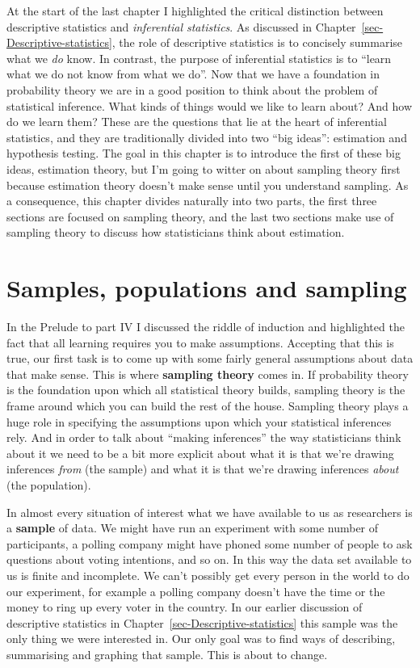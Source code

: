 \documentclass[
  a4paper,
]{book}
\begin{document}
At the start of the last chapter I highlighted the critical distinction
between descriptive statistics and \emph{inferential statistics}. As
discussed in Chapter~\ref{sec-Descriptive-statistics}, the role of
descriptive statistics is to concisely summarise what we \emph{do} know.
In contrast, the purpose of inferential statistics is to ``learn what we
do not know from what we do''. Now that we have a foundation in
probability theory we are in a good position to think about the problem
of statistical inference. What kinds of things would we like to learn
about? And how do we learn them? These are the questions that lie at the
heart of inferential statistics, and they are traditionally divided into
two ``big ideas'': estimation and hypothesis testing. The goal in this
chapter is to introduce the first of these big ideas, estimation theory,
but I'm going to witter on about sampling theory first because
estimation theory doesn't make sense until you understand sampling. As a
consequence, this chapter divides naturally into two parts, the first
three sections are focused on sampling theory, and the last two sections
make use of sampling theory to discuss how statisticians think about
estimation.

\hypertarget{samples-populations-and-sampling}{%
\section{Samples, populations and
sampling}\label{samples-populations-and-sampling}}

In the Prelude to part IV I discussed the riddle of induction and
highlighted the fact that all learning requires you to make assumptions.
Accepting that this is true, our first task is to come up with some
fairly general assumptions about data that make sense. This is where
\textbf{sampling theory} comes in. If probability theory is the
foundation upon which all statistical theory builds, sampling theory is
the frame around which you can build the rest of the house. Sampling
theory plays a huge role in specifying the assumptions upon which your
statistical inferences rely. And in order to talk about ``making
inferences'' the way statisticians think about it we need to be a bit
more explicit about what it is that we're drawing inferences \emph{from}
(the sample) and what it is that we're drawing inferences \emph{about}
(the population).

In almost every situation of interest what we have available to us as
researchers is a \textbf{sample} of data. We might have run an
experiment with some number of participants, a polling company might
have phoned some number of people to ask questions about voting
intentions, and so on. In this way the data set available to us is
finite and incomplete. We can't possibly get every person in the world
to do our experiment, for example a polling company doesn't have the
time or the money to ring up every voter in the country. In our earlier
discussion of descriptive statistics in
Chapter~\ref{sec-Descriptive-statistics} this sample was the only thing
we were interested in. Our only goal was to find ways of describing,
summarising and graphing that sample. This is about to change.
\end{document}
